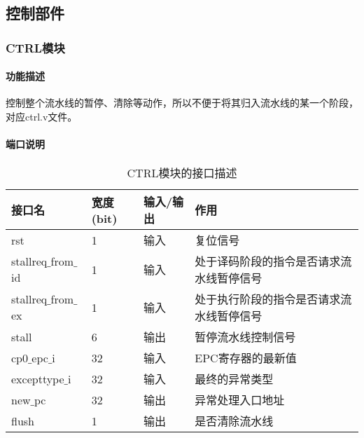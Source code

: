 \subsection{控制部件}
\subsubsection{CTRL模块}
\paragraph{功能描述}
\quad

\quad

控制整个流水线的暂停、清除等动作，所以不便于将其归入流水线的某一个阶段，对应ctrl.v文件。
\paragraph{端口说明}
\quad

\quad
\begin{table}[H]
	\centering
	\caption{CTRL模块的接口描述}
	\begin{tabular}{|l|l|l|l|}
		\hline
		接口名 & 宽度(bit) & 输入/输出 & 作用 \\
		\hline
		rst & 1 & 输入 & 复位信号 \\
		\hline
		stallreq$\_$from$\_$id & 1 & 输入 & 处于译码阶段的指令是否请求流水线暂停信号 \\
		\hline
		stallreq$\_$from$\_$ex & 1 & 输入 & 处于执行阶段的指令是否请求流水线暂停信号 \\
		\hline
		stall & 6 & 输出 & 暂停流水线控制信号 \\
		\hline
		cp0$\_$epc$\_$i & 32 & 输入 & EPC寄存器的最新值 \\
		\hline
		excepttype$\_$i & 32 & 输入 & 最终的异常类型 \\
		\hline
		new$\_$pc & 32 & 输出 & 异常处理入口地址 \\
		\hline
		flush & 1 & 输出 & 是否清除流水线 \\
		\hline
	\end{tabular}
\end{table}
